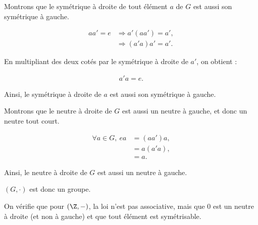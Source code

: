 Montrons que le symétrique à droite de tout élément $a$ de $G$ est aussi son symétrique à gauche.

\begin{align*}
    aa' = e &\Rightarrow a'(aa') = a', \\
    &\Rightarrow (a'a)a' = a'. 
\end{align*}

En multipliant des deux cotés par le symétrique à droite de $a'$, on obtient :

\begin{align*}
    a'a = e.
\end{align*}

Ainsi, le symétrique à droite de $a$ est aussi son symétrique à gauche.

Montrons que le neutre à droite de $G$ est aussi un neutre à gauche, et donc un neutre tout court.

\begin{align*}
    \forall a \in G,\ ea &= (aa')a, \\
    &= a(a'a), \\
    &= a.
\end{align*}

Ainsi, le neutre à droite de $G$ est aussi un neutre à gauche.

$(G, \cdot)$ est donc un groupe.

On vérifie que pour $(\Z, -)$, la loi n'est pas associative, mais que 0 est un neutre à droite (et non à gauche) et que tout élément est symétrisable.